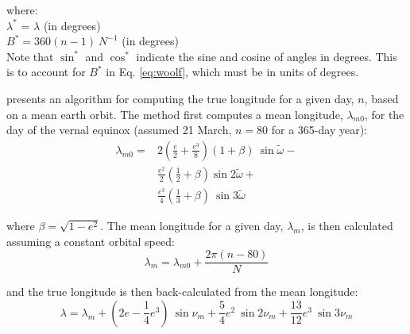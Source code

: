 \noindent where: \\
\indent $\lambda^{\ast}$ = $\lambda$ (in degrees) \\
\indent $B^{\ast} = 360 \left(n - 1\right)\: N^{-1}$ (in degrees)\\

\noindent Note that $\sin^{\ast}$ and $\cos^{\ast}$ indicate the sine and cosine of angles in degrees. This is to account for $B^{\ast}$ in Eq. \ref{eq:woolf}, which must be in units of degrees.

\cite{berger78} presents an algorithm for computing the true longitude for a given day, $n$, based on a mean earth orbit. 
The method first computes a mean longitude, $\lambda_{m0}$, for the day of the vernal equinox (assumed 21 March, $n = 80$ for a 365-day year): 
\begin{equation}
\label{eq:lambdamo}
\begin{split}
	\lambda_{m0} = & 2\left(\frac{e}{2}+\frac{e^3}{8}\right)\left(1+\beta\right)\:\sin\tilde{\omega} - \\
	& \frac{e^2}{2}\left(\frac{1}{2}+\beta\right)\sin 2\tilde{\omega} + \\
	& \frac{e^3}{4}\left(\frac{1}{3}+\beta\right)\:\sin 3\tilde{\omega}
\end{split}
\end{equation}

\noindent where $\beta = \sqrt{1-e^2}$. 
The mean longitude for a given day, $\lambda_m$, is then calculated assuming a constant orbital speed: 
\begin{equation}
\label{eq:lambdam}
	\lambda_m = \lambda_{m0} + \frac{2\pi\left(n-80\right)}{N}
\end{equation}

\noindent and the true longitude is then back-calculated from the mean longitude:
\begin{equation}
\label{eq:lambdat}
	\lambda = \lambda_m + \left(2e-\frac{1}{4}e^3\right)\:\sin\nu_m + \frac{5}{4}e^2\:\sin 2\nu_m + \frac{13}{12}e^3\:\sin 3\nu_m
\end{equation}

